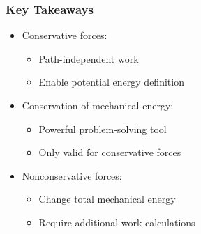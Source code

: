 \documentclass{beamer}
\begin{document}
\begin{frame}
\frametitle{Key Takeaways}
\begin{itemize}
    \item Conservative forces:
    \begin{itemize}
        \item Path-independent work
        \item Enable potential energy definition
    \end{itemize}
    \item Conservation of mechanical energy:
    \begin{itemize}
        \item Powerful problem-solving tool
        \item Only valid for conservative forces
    \end{itemize}
    \item Nonconservative forces:
    \begin{itemize}
        \item Change total mechanical energy
        \item Require additional work calculations
    \end{itemize}
\end{itemize}
\end{frame}
\end{document}
